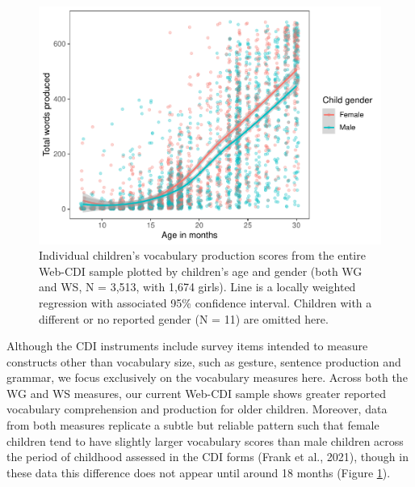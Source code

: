 \documentclass[
  english,
  ,man,floatsintext]{apa6}
\begin{document}
\begin{figure}
\centering
\includegraphics{webcdi_paper_files/figure-latex/genderfig-1.pdf}
\caption{\label{fig:genderfig}Individual children's vocabulary production scores from the entire Web-CDI sample plotted by children's age and gender (both WG and WS, N = 3,513, with 1,674 girls). Line is a locally weighted regression with associated 95\% confidence interval. Children with a different or no reported gender (N = 11) are omitted here.}
\end{figure}

Although the CDI instruments include survey items intended to measure constructs other than vocabulary size, such as gesture, sentence production and grammar, we focus exclusively on the vocabulary measures here. Across both the WG and WS measures, our current Web-CDI sample shows greater reported vocabulary comprehension and production for older children. Moreover, data from both measures replicate a subtle but reliable pattern such that female children tend to have slightly larger vocabulary scores than male children across the period of childhood assessed in the CDI forms (Frank et al., 2021), though in these data this difference does not appear until around 18 months (Figure \ref{fig:genderfig}).
\end{document}
